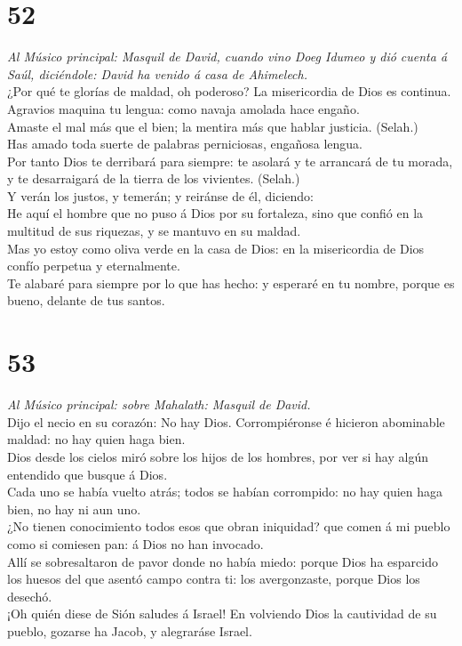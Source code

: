 \hypertarget{section-51}{%
\section{52}\label{section-51}}

 \emph{Al Músico principal: Masquil de David, cuando vino
Doeg Idumeo y dió cuenta á Saúl, diciéndole: David ha venido á casa de
Ahimelech.}\\
¿Por qué te glorías de maldad, oh poderoso? La misericordia de Dios es
continua.\\
 Agravios maquina tu lengua: como navaja amolada hace
engaño.\\
 Amaste el mal más que el bien; la mentira más que hablar
justicia. (Selah.)\\
 Has amado toda suerte de palabras perniciosas, engañosa
lengua.\\
 Por tanto Dios te derribará para siempre: te asolará y te
arrancará de tu morada, y te desarraigará de la tierra de los vivientes.
(Selah.)\\
 Y verán los justos, y temerán; y reiránse de él,
diciendo:\\
 He aquí el hombre que no puso á Dios por su fortaleza, sino
que confió en la multitud de sus riquezas, y se mantuvo en su maldad.\\
 Mas yo estoy como oliva verde en la casa de Dios: en la
misericordia de Dios confío perpetua y eternalmente.\\
 Te alabaré para siempre por lo que has hecho: y esperaré en
tu nombre, porque es bueno, delante de tus santos.

\hypertarget{section-52}{%
\section{53}\label{section-52}}

 \emph{Al Músico principal: sobre Mahalath: Masquil de
David.}\\
Dijo el necio en su corazón: No hay Dios. Corrompiéronse é hicieron
abominable maldad: no hay quien haga bien.\\
 Dios desde los cielos miró sobre los hijos de los hombres,
por ver si hay algún entendido que busque á Dios.\\
 Cada uno se había vuelto atrás; todos se habían corrompido:
no hay quien haga bien, no hay ni aun uno.\\
 ¿No tienen conocimiento todos esos que obran iniquidad? que
comen á mi pueblo como si comiesen pan: á Dios no han invocado.\\
 Allí se sobresaltaron de pavor donde no había miedo: porque
Dios ha esparcido los huesos del que asentó campo contra ti: los
avergonzaste, porque Dios los desechó.\\
 ¡Oh quién diese de Sión saludes á Israel! En volviendo Dios
la cautividad de su pueblo, gozarse ha Jacob, y alegraráse Israel.

